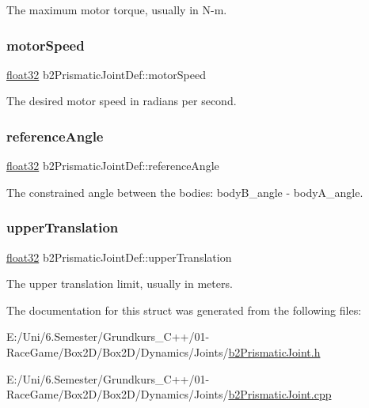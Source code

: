 The maximum motor torque, usually in N-\/m. 

\mbox{\label{structb2_prismatic_joint_def_ac4bdaea15653657e724a04fc60f3f235}} 
\subsubsection{\texorpdfstring{motorSpeed}{motorSpeed}}
{\footnotesize\ttfamily \mbox{\hyperlink{b2_settings_8h_aacdc525d6f7bddb3ae95d5c311bd06a1}{float32}} b2\+Prismatic\+Joint\+Def\+::motor\+Speed}



The desired motor speed in radians per second. 

\mbox{\label{structb2_prismatic_joint_def_aa84b43d08e6e11b4daa0c86f46094463}} 
\subsubsection{\texorpdfstring{referenceAngle}{referenceAngle}}
{\footnotesize\ttfamily \mbox{\hyperlink{b2_settings_8h_aacdc525d6f7bddb3ae95d5c311bd06a1}{float32}} b2\+Prismatic\+Joint\+Def\+::reference\+Angle}



The constrained angle between the bodies\+: body\+B\+\_\+angle -\/ body\+A\+\_\+angle. 

\mbox{\label{structb2_prismatic_joint_def_ae3eac123c7fe543071bdfcd1a6942350}} 
\subsubsection{\texorpdfstring{upperTranslation}{upperTranslation}}
{\footnotesize\ttfamily \mbox{\hyperlink{b2_settings_8h_aacdc525d6f7bddb3ae95d5c311bd06a1}{float32}} b2\+Prismatic\+Joint\+Def\+::upper\+Translation}



The upper translation limit, usually in meters. 



The documentation for this struct was generated from the following files\+:\begin{DoxyCompactItemize}
\item 
E\+:/\+Uni/6.\+Semester/\+Grundkurs\+\_\+\+C++/01-\/\+Race\+Game/\+Box2\+D/\+Box2\+D/\+Dynamics/\+Joints/\mbox{\hyperlink{b2_prismatic_joint_8h}{b2\+Prismatic\+Joint.\+h}}\item 
E\+:/\+Uni/6.\+Semester/\+Grundkurs\+\_\+\+C++/01-\/\+Race\+Game/\+Box2\+D/\+Box2\+D/\+Dynamics/\+Joints/\mbox{\hyperlink{b2_prismatic_joint_8cpp}{b2\+Prismatic\+Joint.\+cpp}}\end{DoxyCompactItemize}
